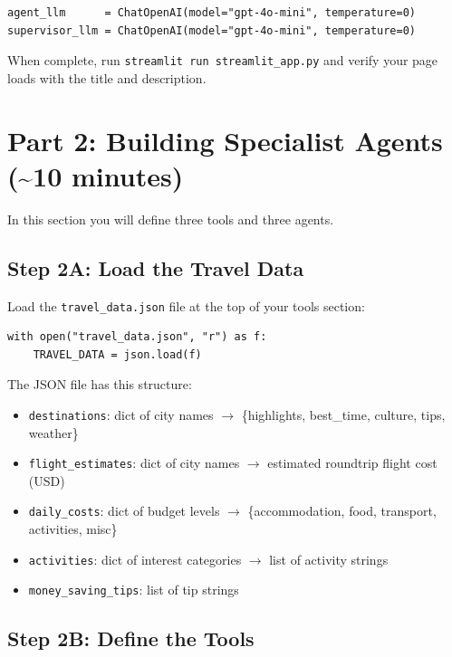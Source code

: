 \documentclass[11pt, letterpaper]{article}
\begin{document}
\begin{lstlisting}
agent_llm      = ChatOpenAI(model="gpt-4o-mini", temperature=0)
supervisor_llm = ChatOpenAI(model="gpt-4o-mini", temperature=0)
\end{lstlisting}

When complete, run \texttt{streamlit run streamlit\_app.py} and verify your page loads with the title and description.


\section{Part 2: Building Specialist Agents \textnormal{(\textasciitilde10 minutes)}}

In this section you will define three tools and three agents.

\subsection*{Step 2A: Load the Travel Data}

Load the \texttt{travel\_data.json} file at the top of your tools section:

\begin{lstlisting}
with open("travel_data.json", "r") as f:
    TRAVEL_DATA = json.load(f)
\end{lstlisting}

\noindent The JSON file has this structure:
\begin{itemize}[nosep]
  \item \texttt{destinations}: dict of city names $\rightarrow$ \{highlights, best\_time, culture, tips, weather\}
  \item \texttt{flight\_estimates}: dict of city names $\rightarrow$ estimated roundtrip flight cost (USD)
  \item \texttt{daily\_costs}: dict of budget levels $\rightarrow$ \{accommodation, food, transport, activities, misc\}
  \item \texttt{activities}: dict of interest categories $\rightarrow$ list of activity strings
  \item \texttt{money\_saving\_tips}: list of tip strings
\end{itemize}

\subsection*{Step 2B: Define the Tools}
\end{document}
